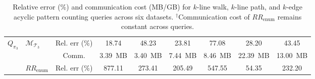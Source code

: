 \begin{table}[hbtp!]
\begin{threeparttable}
{\begin{tabular}{clccccccc}
\midrule 
\multirow[c]{3}{*}{{$Q_{\pi_3}$}}
& \multirow[c]{2}{*}{{$\mathcal{M}_{\mathcal{T}_3}$}}
& {Rel. err (\%)} 
& \cellcolor{gray!35} {18.74} 
& \cellcolor{gray!35} {48.23} 
& \cellcolor{gray!35} {23.81} 
& \cellcolor{gray!35} {77.08} 
& \cellcolor{gray!35} {28.20} 
& \cellcolor{gray!35} {43.45} \\
& & {Comm.} 
& \cellcolor{gray!12} {3.39~MB} 
& \cellcolor{gray!12} {3.40~MB} 
& \cellcolor{gray!12} {7.44~MB} 
& \cellcolor{gray!12} {8.46~MB} 
& \cellcolor{gray!12} {22.39~MB} 
& \cellcolor{gray!12} {13.00~MB} \\
\cmidrule(lr){2-9}
& \multirow[c]{1}{*}{{$RR_{\text{enum}}$}}
& {Rel. err (\%)} 
& {877.11}
& {273.41} 
& {205.49} 
& {547.55} 
& {54.35} 
& {232.20} \\

\bottomrule
\end{tabular}
}
\end{threeparttable}
\caption{
Relative error (\%) and communication cost (MB{/GB}) for $k$-line walk, $k$-line path, and $k$-edge acyclic pattern counting queries across six datasets.  
$^\dagger$Communication cost of $RR_{\mathrm{enum}}$ remains constant across queries.  
}
\label{tab:3queries}
\end{table}
